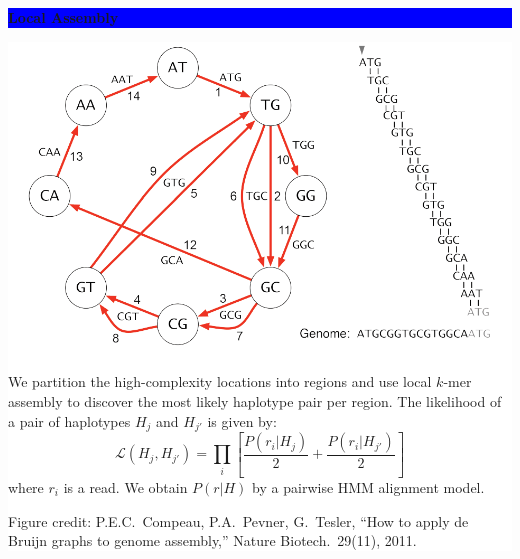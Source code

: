 \documentclass[11pt]{a0poster}
\begin{document}
{\begin{minipage}[t][2045pt][t]{\linewidth}
\begin{minipage}{0.6\linewidth}
\vspace{75pt}
\colorbox{Blue}{
\begin{minipage}[t]{\linewidth}
\vspace{30pt}
\begin{center}
\Huge \bf \color{White} Local Assembly
\end{center}
\vspace{17pt}
\end{minipage}
}
\colorbox{White}{
\begin{minipage}[t][400pt][t]{0.3\linewidth}
\vspace{20pt}
\includegraphics[width=0.9\linewidth]{assembly-fig.pdf}
\pagebreak
\end{minipage}
\begin{minipage}[t][400pt][t]{0.7\linewidth}
\vspace{20pt}
\color{Blue}
\LARGE We partition the high-complexity locations into regions and use local
$k$-mer assembly to discover the most likely haplotype pair per region.
The likelihood of a pair of haplotypes $H_j$ and $H_{j'}$ is given by:
\large $$ \mathcal{L}(H_j,H_{j'})=\prod_i\left[ \frac{P(r_i|H_j)}{2}+\frac{P(r_i|H_{j'})}{2} \right] $$
\LARGE where $r_i$ is a read.
We obtain $P(r|H)$ by a pairwise HMM alignment model.

\small \hfill

\small Figure credit:
  P.E.C.~Compeau, P.A.~Pevner, G.~Tesler,
  ``How to apply de Bruijn graphs to genome assembly,'' Nature Biotech.~29(11), 2011.
\pagebreak
\end{minipage}
}


\end{minipage}
\end{minipage}}
\end{document}
